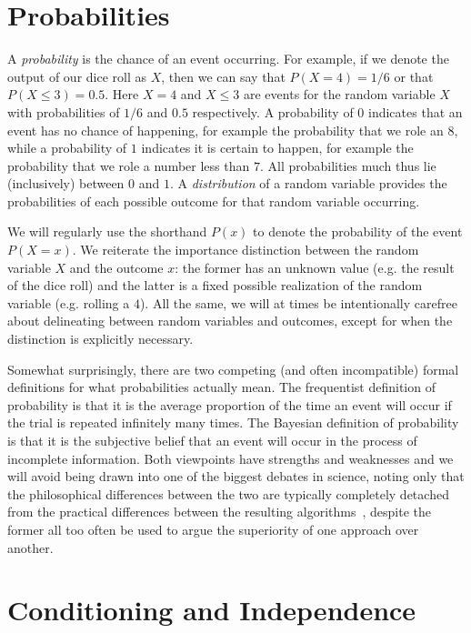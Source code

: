 \section{Probabilities}
\label{sec:prob:prob}

A \emph{probability} is
the chance of an event occurring.  For example, if we denote the output
of our dice roll as $X$, then we can say that $P(X=4) = 1/6$ or that $P(X\le3) = 0.5$.  Here
$X=4$ and $X\le3$ are events for the random variable $X$ with probabilities of $1/6$ and $0.5$
respectively.   A probability of $0$ indicates that an event has no chance of happening, 
for example the probability that we role an $8$, while
a probability of $1$ indicates it is certain to happen, for example the probability 
that we role a number less than $7$.  All probabilities much thus lie (inclusively) between $0$ and $1$.  
A \emph{distribution} of a random variable provides the probabilities of each possible 
outcome for that random variable occurring.

We will regularly use the shorthand $P(x)$ to denote the probability of the event $P(X=x)$.  
We reiterate the importance distinction between the random variable $X$ and the outcome $x$:
the former has an unknown value (e.g. the result of the dice roll) and the latter is
a fixed possible realization of the random variable (e.g. rolling a $4$).
All the same, we will at times be intentionally carefree about delineating between
random variables and outcomes, except for when the distinction is explicitly necessary.

Somewhat surprisingly, there are two competing (and often incompatible)
formal definitions for what probabilities actually mean.  The frequentist definition of
probability is that it is the average proportion of the time an event will occur if the trial is 
repeated infinitely many times.  The Bayesian definition of probability is that it is the subjective
belief that an event will occur in the process of incomplete information.  Both viewpoints have
strengths and weaknesses and we will avoid being drawn into one of the biggest debates in
science, noting only that the philosophical differences between the two are typically completely
detached from the practical differences between the resulting
algorithms~\citep{steinhardt2012beyond}, despite the former all too often be used to argue
the superiority of one approach over another.

\section{Conditioning and Independence}
\label{sec:prob:cond}

